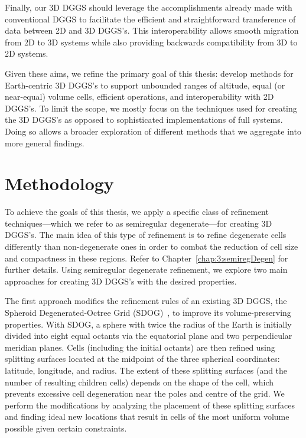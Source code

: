 Finally, our 3D DGGS should leverage the accomplishments already made with conventional DGGS to facilitate the efficient and straightforward transference of data between 2D and 3D DGGS's. This interoperability allows smooth migration from 2D to 3D systems while also providing backwards compatibility from 3D to 2D systems.


Given these aims, we refine the primary goal of this thesis: develop methods for Earth-centric 3D DGGS's to support unbounded ranges of altitude, equal (or near-equal) volume cells, efficient operations, and interoperability with 2D DGGS's.
To limit the scope, we mostly focus on the techniques used for creating the 3D DGGS's as opposed to sophisticated implementations of full systems.
Doing so allows a broader exploration of different methods that we aggregate into more general findings.


\section{Methodology} \label{chap:1:method}
To achieve the goals of this thesis, we apply a specific class of refinement techniques---which we refer to as semiregular degenerate---for creating 3D DGGS's.
The main idea of this type of refinement is to refine degenerate cells differently than non-degenerate ones in order to combat the reduction of cell size and compactness in these regions.
Refer to Chapter~\ref{chap:3:semiregDegen} for further details.
Using semiregular degenerate refinement, we explore two main approaches for creating 3D DGGS's with the desired properties.


The first approach modifies the refinement rules of an existing 3D DGGS, the Spheroid Degenerated-Octree Grid (SDOG)~\cite{yu2009sdog}, to improve its volume-preserving properties.
With SDOG, a sphere with twice the radius of the Earth is initially divided into eight equal octants via the equatorial plane and two perpendicular meridian planes.
Cells (including the initial octants) are then refined using splitting surfaces located at the midpoint of the three spherical coordinates: latitude, longitude, and radius.
The extent of these splitting surfaces (and the number of resulting children cells) depends on the shape of the cell, which prevents excessive cell degeneration near the poles and centre of the grid.
We perform the modifications by analyzing the placement of these splitting surfaces and finding ideal new locations that result in cells of the most uniform volume possible given certain constraints.



